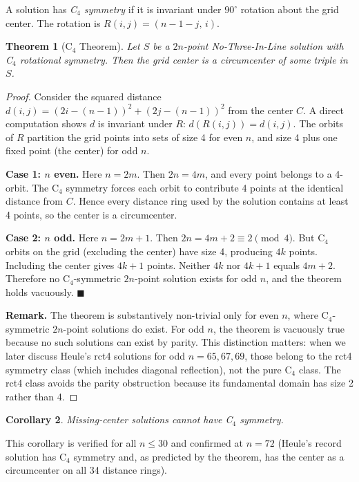 \documentclass[11pt,a4paper]{article}
\theoremstyle{plain}
\newtheorem{theorem}{Theorem}[section]
\newtheorem{corollary}[theorem]{Corollary}
\theoremstyle{definition}
\begin{document}
A solution has \emph{C$_4$ symmetry} if it is invariant under $90^\circ$ rotation about the grid center. The rotation is $R(i,j) = (n-1-j,\, i)$.

\begin{theorem}[C$_4$ Theorem]
\label{thm:c4}
Let $S$ be a $2n$-point No-Three-In-Line solution with C$_4$ rotational symmetry. Then the grid center is a circumcenter of some triple in $S$.
\end{theorem}

\begin{proof}
Consider the squared distance $d(i,j) = (2i-(n-1))^2 + (2j-(n-1))^2$ from the center $C$. A direct computation shows $d$ is invariant under $R$: $d(R(i,j)) = d(i,j)$. The orbits of $R$ partition the grid points into sets of size 4 for even $n$, and size 4 plus one fixed point (the center) for odd $n$.

\textbf{Case 1: $n$ even.} Here $n=2m$. Then $2n=4m$, and every point belongs to a 4-orbit. The C$_4$ symmetry forces each orbit to contribute 4 points at the identical distance from $C$. Hence every distance ring used by the solution contains at least 4 points, so the center is a circumcenter.

\textbf{Case 2: $n$ odd.} Here $n=2m+1$. Then $2n=4m+2\equiv2\pmod{4}$. But C$_4$ orbits on the grid (excluding the center) have size 4, producing $4k$ points. Including the center gives $4k+1$ points. Neither $4k$ nor $4k+1$ equals $4m+2$. Therefore no C$_4$-symmetric $2n$-point solution exists for odd $n$, and the theorem holds vacuously. $\blacksquare$

\noindent\textbf{Remark.} The theorem is substantively non-trivial only for even $n$, where C$_4$-symmetric $2n$-point solutions do exist. For odd $n$, the theorem is vacuously true because no such solutions can exist by parity. This distinction matters: when we later discuss Heule's rct4 solutions for odd $n=65,67,69$, those belong to the rct4 symmetry class (which includes diagonal reflection), not the pure C$_4$ class. The rct4 class avoids the parity obstruction because its fundamental domain has size 2 rather than 4.
\end{proof}

\begin{corollary}
Missing-center solutions cannot have C$_4$ symmetry.
\end{corollary}

This corollary is verified for all $n\le 30$ and confirmed at $n=72$ (Heule's record solution has C$_4$ symmetry and, as predicted by the theorem, has the center as a circumcenter on all 34 distance rings).
\end{document}

